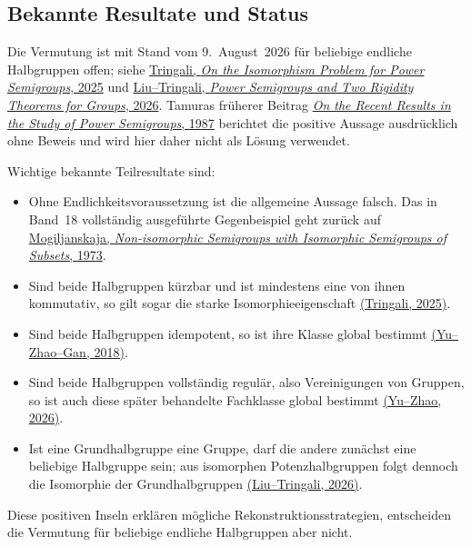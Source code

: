 \documentclass[main.tex]{subfiles}
\begin{document}
\subsection{Bekannte Resultate und Status}

\begin{remark}
Die Vermutung ist mit Stand vom 9.~August~2026 für beliebige endliche
Halbgruppen offen; siehe
\href{https://doi.org/10.1007/978-3-031-75326-8_20}%
  {Tringali, \emph{On the Isomorphism Problem for Power Semigroups}, 2025}
und
\href{https://doi.org/10.48550/arXiv.2606.01917}%
  {Liu--Tringali, \emph{Power Semigroups and Two Rigidity Theorems for
  Groups}, 2026}.
Tamuras früherer Beitrag
\href{https://doi.org/10.1007/978-94-009-3839-7_22}%
  {\emph{On the Recent Results in the Study of Power Semigroups}, 1987}
berichtet die positive Aussage ausdrücklich ohne Beweis und wird hier daher
nicht als Lösung verwendet.

Wichtige bekannte Teilresultate sind:
\begin{itemize}
  \item Ohne Endlichkeitsvoraussetzung ist die allgemeine Aussage falsch.
    Das in Band~18 vollständig ausgeführte Gegenbeispiel geht zurück auf
    \href{https://doi.org/10.1007/BF02389140}%
      {Mogiljanskaja, \emph{Non-isomorphic Semigroups with Isomorphic
      Semigroups of Subsets}, 1973}.
  \item Sind beide Halbgruppen kürzbar und ist mindestens eine von ihnen
    kommutativ, so gilt sogar die starke Isomorphieeigenschaft
    \href{https://doi.org/10.1007/978-3-031-75326-8_20}%
      {(Tringali, 2025)}.
  \item Sind beide Halbgruppen idempotent, so ist ihre Klasse global bestimmt
    \href{https://doi.org/10.1080/00927872.2017.1319474}%
      {(Yu--Zhao--Gan, 2018)}.
  \item Sind beide Halbgruppen vollständig regulär, also Vereinigungen von
    Gruppen, so ist auch diese später behandelte Fachklasse global bestimmt
    \href{https://doi.org/10.1080/00927872.2026.2659846}%
      {(Yu--Zhao, 2026)}.
  \item Ist eine Grundhalbgruppe eine Gruppe, darf die andere zunächst eine
    beliebige Halbgruppe sein; aus isomorphen Potenzhalbgruppen folgt
    dennoch die Isomorphie der Grundhalbgruppen
    \href{https://doi.org/10.48550/arXiv.2606.01917}%
      {(Liu--Tringali, 2026)}.
\end{itemize}
Diese positiven Inseln erklären mögliche Rekonstruktionsstrategien, entscheiden
die Vermutung für beliebige endliche Halbgruppen aber nicht.
\end{remark}
\end{document}
